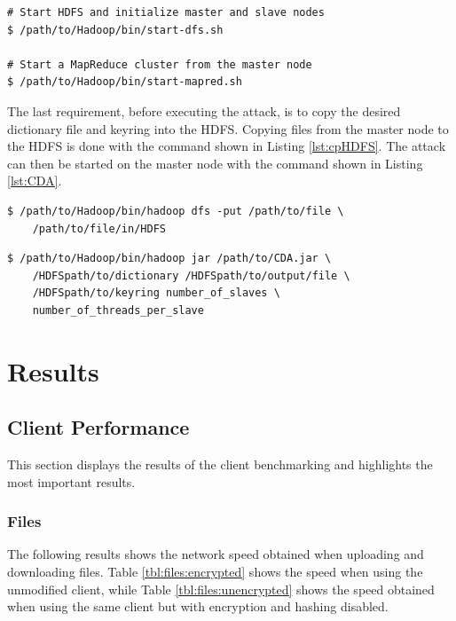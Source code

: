 \documentclass[pdftex,english,10pt,b5paper,twoside]{book}
\begin{document}
\lstset{language=bash, label=lst:hadoop, caption=Starting Hadoop cluster with HDFS}
\begin{lstlisting}
# Start HDFS and initialize master and slave nodes
$ /path/to/Hadoop/bin/start-dfs.sh

# Start a MapReduce cluster from the master node
$ /path/to/Hadoop/bin/start-mapred.sh
\end{lstlisting}

\noindent The last requirement, before executing the attack, is to copy the
desired dictionary file and keyring into the \ac{HDFS}. Copying files from the
master node to the \ac{HDFS} is done with the command shown in Listing
\ref{lst:cpHDFS}. The attack can then be started on the master node with the
command shown in Listing \ref{lst:CDA}. 

\lstset{language=bash, label=lst:cpHDFS, caption=Copying files into HDFS}
\begin{lstlisting}
$ /path/to/Hadoop/bin/hadoop dfs -put /path/to/file \
    /path/to/file/in/HDFS
\end{lstlisting}

\lstset{language=bash, label=lst:CDA, caption=Executing the CDA attack}
\begin{lstlisting}
$ /path/to/Hadoop/bin/hadoop jar /path/to/CDA.jar \
    /HDFSpath/to/dictionary /HDFSpath/to/output/file \
    /HDFSpath/to/keyring number_of_slaves \
    number_of_threads_per_slave
\end{lstlisting}
\chapter{Results}
\section{Client Performance}
This section displays the results of the client benchmarking and highlights the
most important results.

\subsection{Files} The following results shows the network speed obtained when
uploading and downloading files. Table \ref{tbl:files:encrypted} shows the
speed when using the unmodified client, while Table \ref{tbl:files:unencrypted}
shows the speed obtained when using the same client but with encryption and
hashing disabled.
\end{document}
